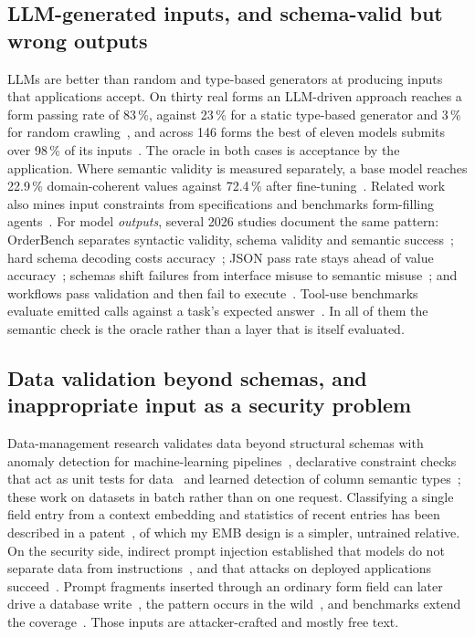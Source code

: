 \documentclass[conference]{IEEEtran}
\begin{document}
\subsection{LLM-generated inputs, and schema-valid but wrong outputs}
LLMs are better than random and type-based generators at producing inputs that applications accept. On
thirty real forms an LLM-driven approach reaches a form passing rate of 83\,\%, against 23\,\% for a
static type-based generator and 3\,\% for random crawling~\cite{alian2024formnexus}, and across 146
forms the best of eleven models submits over 98\,\% of its inputs~\cite{li2026webformtest}. The oracle
in both cases is acceptance by the application. Where semantic validity is measured separately, a base
model reaches 22.9\,\% domain-coherent values against 72.4\,\% after
fine-tuning~\cite{kim2025llamaresttest}. Related work also mines input constraints from specifications and benchmarks form-filling
agents~\cite{li2025formfactory}. For model \emph{outputs},
several 2026 studies document the same pattern: OrderBench separates syntactic validity, schema
validity and semantic success~\cite{li2026orderbench}; hard schema decoding costs
accuracy~\cite{ray2026constrainttax}; JSON pass rate stays ahead of value
accuracy~\cite{singh2026sob}; schemas shift failures from interface misuse to semantic
misuse~\cite{sigdel2026schemafirst}; and workflows pass validation and then fail to
execute~\cite{wrenn2026enterprise}. Tool-use benchmarks evaluate emitted calls against a task's expected
answer~\cite{yu2026wildtoolbench,yu2026parambench}. In all of them the semantic check is the oracle
rather than a layer that is itself evaluated.

\subsection{Data validation beyond schemas, and inappropriate input as a security problem}
Data-management research validates data beyond structural schemas with anomaly detection for
machine-learning pipelines~\cite{breck2019datavalidation}, declarative constraint checks that act as
unit tests for data~\cite{schelter2018deequ} and learned detection of column semantic
types~\cite{hulsebos2019sherlock}; these work on datasets in batch rather than on one request.
Classifying a single field entry from a context embedding and statistics of recent entries has been
described in a patent~\cite{banerjee2025contextembedding}, of which my EMB design is a simpler,
untrained relative. On the security side, indirect prompt injection established that models do not
separate data from instructions~\cite{greshake2023indirect}, and that attacks on deployed applications
succeed~\cite{kaya2026chatbotplugins}. Prompt fragments inserted through an ordinary form field
can later drive a database write~\cite{pedro2025p2sql}, the pattern occurs in the
wild~\cite{khodayari2026ipiwild}, and benchmarks extend the
coverage~\cite{yi2025bipia,evtimov2025wasp}.
Those inputs are attacker-crafted and mostly free text.
\end{document}
